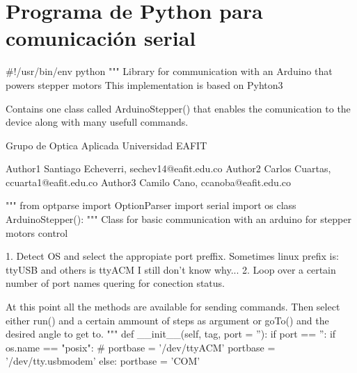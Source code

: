 \section{Programa de Python para comunicación serial}
\label{sec:python_serial}
\begin{python}
#!/usr/bin/env python
""" Library for communication with an Arduino that powers stepper motors
This implementation is based on Pyhton3

Contains one class called ArduinoStepper() that enables the comunication to
the device along with many usefull commands.

Grupo de Optica Aplicada Universidad EAFIT

Author1  Santiago Echeverri, sechev14@eafit.edu.co
Author2  Carlos Cuartas, ccuarta1@eafit.edu.co
Author3  Camilo Cano, ccanoba@eafit.edu.co

"""
from optparse import OptionParser
import serial
import os
class ArduinoStepper():
    """ Class for basic communication with an arduino for stepper motors control
    
     1. Detect OS and select the appropiate port preffix.
        Sometimes linux prefix is: ttyUSB and others is ttyACM
        I still don't know why...
     2. Loop over a certain number of port names quering for conection status.

     At this point all the methods are available for sending commands.
     Then select either run() and a certain ammount of steps as argument 
     or goTo() and the desired angle to get to.
    """
    def __init__(self, tag, port = ''):
        if port == '':
            if os.name == "posix":
                # portbase = '/dev/ttyACM'
                portbase = '/dev/tty.usbmodem'
            else:
                portbase = 'COM'
    

\end{python}
